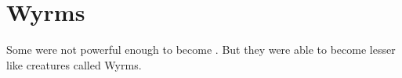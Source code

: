 \section{Wyrms}
Some \ophidians were not powerful enough to become \dragons.
But they were able to become lesser \dragon{}like creatures called Wyrms. 



























